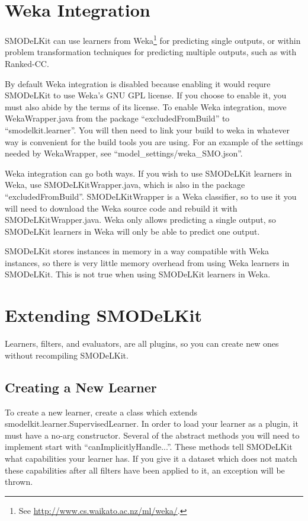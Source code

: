 \documentclass[twoside,11pt]{article}
\begin{document}
\section{Weka Integration}
SMODeLKit can use learners from Weka\footnote{See \url{http://www.cs.waikato.ac.nz/ml/weka/}.} for predicting single outputs, or within problem transformation techniques for predicting multiple outputs, such as with Ranked-CC. 

By default Weka integration is disabled because enabling it would requre SMODeLKit to use Weka's GNU GPL license. If you choose to enable it, you must also abide by the terms of its license. To enable Weka integration, move WekaWrapper.java from the package ``excludedFromBuild'' to ``smodelkit.learner''. You will then need to link your build to weka in whatever way is convenient for the build tools you are using. For an example of the settings needed by WekaWrapper, see ``model\_settings/weka\_SMO.json''. 

Weka integration can go both ways. If you wish to use SMODeLKit learners in Weka, use SMODeLKitWrapper.java, which is also in the package ``excludedFromBuild''. SMODeLKitWrapper is a Weka classifier, so to use it you will need to download the Weka source code and rebuild it with SMODeLKitWrapper.java. Weka only allows predicting a single output, so SMODeLKit learners in Weka will only be able to predict one output.

SMODeLKit stores instances in memory in a way compatible with Weka instances, so there is very little memory overhead from using Weka learners in SMODeLKit. This is not true when using SMODeLKit learners in Weka.

\section{Extending SMODeLKit}
Learners, filters, and evaluators, are all plugins, so you can create new ones without recompiling SMODeLKit.

\subsection{Creating a New Learner}
To create a new learner, create a class which extends smodelkit.learner.SupervisedLearner. In order to load your learner as a plugin, it must have a no-arg constructor. Several of the abstract methods you will need to implement start with ``canImplicitlyHandle...''. These methods tell SMODeLKit what capabilities your learner has. If you give it a dataset which does not match these capabilities after all filters have been applied to it, an exception will be thrown. 
\end{document}
